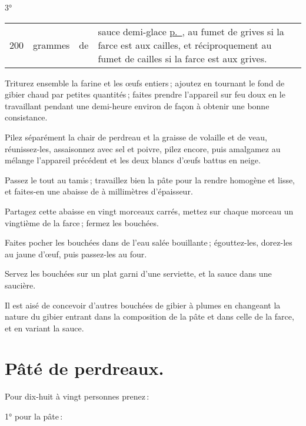 3°

\footnotesize
\begin{longtable}{rrrp{16em}}
  200 & grammes & de & sauce demi-glace \hyperlink{p0456}{p. \pageref{pg0456}}, au fumet de 
                          grives si la farce est aux cailles, et réciproquement au fumet 
                          de cailles si la farce est aux grives.                                          \\
\end{longtable}
\normalsize

Triturez ensemble la farine et les œufs entiers ; ajoutez en tournant le fond
de gibier chaud par petites quantités ; faites prendre l'appareil sur feu doux
en le travaillant pendant une demi-heure environ de façon à obtenir une bonne
consistance.

Pilez séparément la chair de perdreau et la graisse de volaille et de veau,
réunissez-les, assaisonnez avec sel et poivre, pilez encore, puis amalgamez au
mélange l'appareil précédent et les deux blancs d'œufs battus en neige.

Passez le tout au tamis ; travaillez bien la pâte pour la rendre homogène et
lisse, et faites-en une abaisse de {\mmm} à {\mmm} millimètres d'épaisseur.

Partagez cette abaisse en vingt morceaux carrés, mettez sur chaque morceau un
vingtième de la farce ; fermez les bouchées.

Faites pocher les bouchées dans de l'eau salée bouillante ; égouttez-les,
dorez-les au jaune d'œuf, puis passez-les au four.

Servez les bouchées sur un plat garni d'une serviette, et la sauce dans une
saucière.

\sk

Il est aisé de concevoir d’autres bouchées de gibier à plumes en changeant la
nature du gibier entrant dans la composition de la pâte et dans celle de la
farce, et en variant la sauce.

\section*{\centering Pâté de perdreaux.}
{}

Pour dix-huit à vingt personnes prenez :

\medskip

1° pour la pâte :

